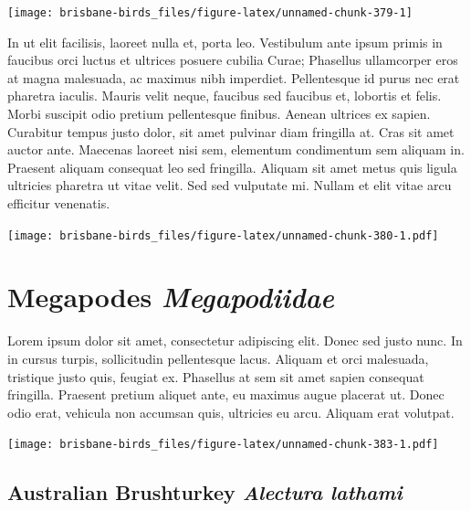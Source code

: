 \documentclass[]{book}
\let\origfigure\figure
\let\endorigfigure\endfigure
\renewenvironment{figure}[1][2] {
  \expandafter\origfigure\expandafter[H]
} {
  \endorigfigure
}
\begin{document}
\begin{figure}
\texttt{[image: brisbane-birds\_files/figure-latex/unnamed-chunk-379-1]} \caption{insert figure caption}\label{fig:unnamed-chunk-379}
\end{figure}

In ut elit facilisis, laoreet nulla et, porta leo. Vestibulum ante ipsum
primis in faucibus orci luctus et ultrices posuere cubilia Curae;
Phasellus ullamcorper eros at magna malesuada, ac maximus nibh
imperdiet. Pellentesque id purus nec erat pharetra iaculis. Mauris velit
neque, faucibus sed faucibus et, lobortis et felis. Morbi suscipit odio
pretium pellentesque finibus. Aenean ultrices ex sapien. Curabitur
tempus justo dolor, sit amet pulvinar diam fringilla at. Cras sit amet
auctor ante. Maecenas laoreet nisi sem, elementum condimentum sem
aliquam in. Praesent aliquam consequat leo sed fringilla. Aliquam sit
amet metus quis ligula ultricies pharetra ut vitae velit. Sed sed
vulputate mi. Nullam et elit vitae arcu efficitur venenatis.

\begin{figure}
\centering
\texttt{[image: brisbane-birds\_files/figure-latex/unnamed-chunk-380-1.pdf]}
\caption{\label{fig:unnamed-chunk-380}insert figure caption}
\end{figure}

\chapter{\texorpdfstring{Megapodes
\emph{Megapodiidae}}{Megapodes Megapodiidae}}\label{megapodes-megapodiidae}

Lorem ipsum dolor sit amet, consectetur adipiscing elit. Donec sed justo
nunc. In in cursus turpis, sollicitudin pellentesque lacus. Aliquam et
orci malesuada, tristique justo quis, feugiat ex. Phasellus at sem sit
amet sapien consequat fringilla. Praesent pretium aliquet ante, eu
maximus augue placerat ut. Donec odio erat, vehicula non accumsan quis,
ultricies eu arcu. Aliquam erat volutpat.

\texttt{[image: brisbane-birds\_files/figure-latex/unnamed-chunk-383-1.pdf]}

\section{\texorpdfstring{Australian Brushturkey \emph{Alectura
lathami}}{Australian Brushturkey Alectura lathami}}\label{australian-brushturkey-alectura-lathami}
\end{document}
